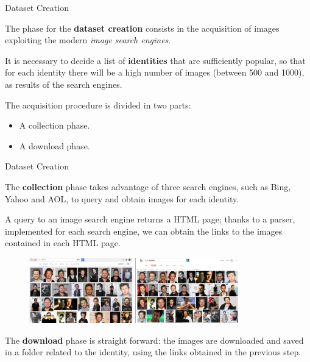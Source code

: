 \begin{tframe}{Dataset Creation}

The phase for the \textbf{dataset creation} consists in the acquisition of images exploiting the modern \textit{image search engines}.

\vspace{0.1in}

It is necessary to decide a list of \textbf{identities} that are sufficiently popular, so that for each identity there will be a high number of images (between 500 and 1000), as results of the search engines.

\vspace{0.1in}

The acquisition procedure is divided in two parts: 

\begin{itemize}
\item A collection phase.
\item A download phase.
\end{itemize}

\end{tframe}

\begin{tframe}{Dataset Creation}

The \textbf{collection} phase takes advantage of three search engines, such as Bing, Yahoo and AOL, to query and obtain images for each identity.

\vspace{0.1in}

A query to an image search engine returns a HTML page; thanks to a parser, implemented for each search engine, we can obtain the links to the images contained in each HTML page.

\begin{figure}[h]
\centering
\hspace*{\fill}
\includegraphics[width=0.40\textwidth]{images/image8.png}
\hspace*{\fill}
\includegraphics[width=0.40\textwidth]{images/image11.png}
\hspace*{\fill}
\end{figure}


The \textbf{download} phase is straight forward: the images are downloaded and saved in a folder related to the identity, using the links obtained in the previous step.

\end{tframe}